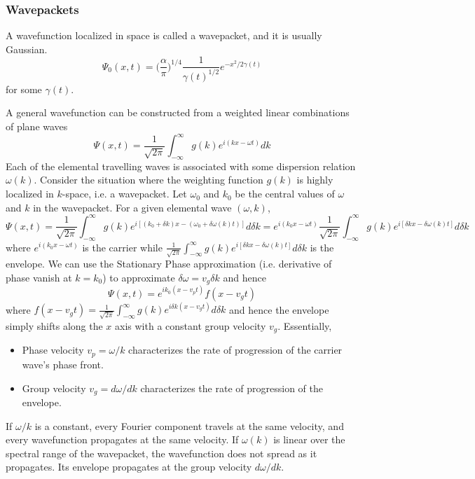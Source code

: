 \documentclass[a4paper]{article}
\begin{document}
\subsubsection*{Wavepackets}
\begin{defi}[Wavepacket]
A wavefunction localized in space is called a wavepacket, and it is usually Gaussian.
$$\Psi_0(x,t)=\bigg(\frac{\alpha}{\pi}\bigg)^{1/4}\frac{1}{\gamma(t)^{1/2}}e^{-x^2/2\gamma(t)}$$
for some $\gamma(t)$. 
\end{defi}
\begin{eg}
A general wavefunction can be constructed from a weighted linear combinations of plane waves
$$\Psi(x,t)=\frac{1}{\sqrt{2\pi}}\int_{-\infty}^\infty g(k)e^{i(kx-\omega t)}dk$$
Each of the elemental travelling waves is associated with some dispersion relation $\omega (k)$. Consider the situation where the weighting function $g(k)$ is highly localized in $k$-space, i.e. a wavepacket. Let $\omega_0$ and $k_0$ be the central values of $\omega$ and $k$ in the wavepacket. For a given elemental wave $(\omega,k)$,
$$\Psi(x,t)=\frac{1}{\sqrt{2\pi}}\int_{-\infty}^\infty g(k)e^{i[(k_0+\delta k)x-(\omega_0+\delta\omega(k)t)]}d\delta k=e^{i(k_0x-\omega t)}\frac{1}{\sqrt{2\pi}}\int_{-\infty}^\infty g(k)e^{i[\delta k x-\delta\omega(k)t]}d\delta k$$
where $e^{i(k_0x-\omega t)}$ is the carrier while $\frac{1}{\sqrt{2\pi}}\int_{-\infty}^\infty g(k)e^{i[\delta k x-\delta\omega(k)t]}d\delta k$ is the envelope. We can use the Stationary Phase approximation (i.e. derivative of phase vanish at $k=k_0$) to approximate $\delta\omega=v_g\delta k$ and hence
$$\Psi(x,t)=e^{ik_0(x-v_pt)}f(x-v_gt)$$
where $f(x-v_gt)=\frac{1}{\sqrt{2\pi}}\int_{-\infty}^\infty g(k)e^{i\delta k(x-v_gt)}d\delta k$ and hence the envelope simply shifts along the $x$ axis with a constant group velocity $v_g$. Essentially,
\begin{itemize}
    \item Phase velocity $v_p=\omega/k$ characterizes the rate of progression of the carrier wave's phase front.
    \item Group velocity $v_g=d\omega/dk$ characterizes the rate of progression of the envelope.
\end{itemize}
If $\omega/k$ is a constant, every Fourier component travels at the same velocity, and every wavefunction propagates at the same velocity. If $\omega(k)$ is linear over the spectral range of the wavepacket, the wavefunction does not spread as it propagates. Its envelope propagates at the group velocity $d\omega/dk$.
\end{eg}
\end{document}
